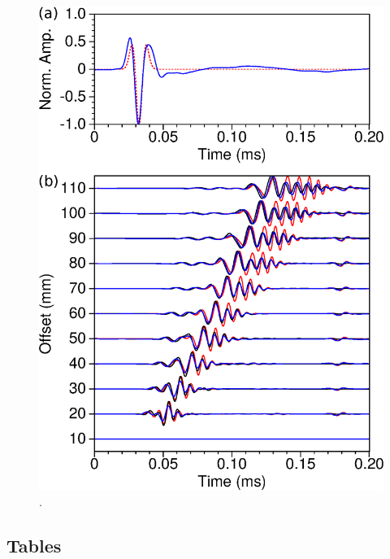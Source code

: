 \documentclass[manuscript,revised]{geophysics}
\begin{document}
\begin{figure}[!h]
	\centering
	\includegraphics[scale=0.5]{fig/panel_bialt_lswe.eps}
	\caption{.}
	\label{blind-test}
\end{figure}

\clearpage
\newpage

\subsection*{Tables}
\end{document}
